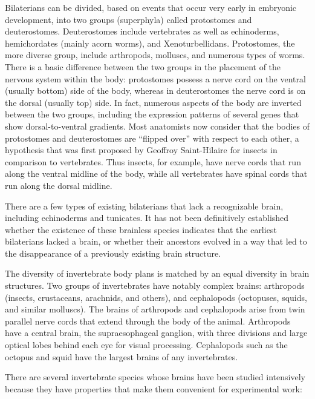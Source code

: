 \documentclass[]{book}
\begin{document}
Bilaterians can be divided, based on events that occur very early in embryonic development, into two groups (superphyla) called protostomes and deuterostomes. Deuterostomes include vertebrates as well as echinoderms, hemichordates (mainly acorn worms), and Xenoturbellidans. Protostomes, the more diverse group, include arthropods, molluscs, and numerous types of worms. There is a basic difference between the two groups in the placement of the nervous system within the body: protostomes possess a nerve cord on the ventral (usually bottom) side of the body, whereas in deuterostomes the nerve cord is on the dorsal (usually top) side. In fact, numerous aspects of the body are inverted between the two groups, including the expression patterns of several genes that show dorsal-to-ventral gradients. Most anatomists now consider that the bodies of protostomes and deuterostomes are ``flipped over'' with respect to each other, a hypothesis that was first proposed by Geoffroy Saint-Hilaire for insects in comparison to vertebrates. Thus insects, for example, have nerve cords that run along the ventral midline of the body, while all vertebrates have spinal cords that run along the dorsal midline.

There are a few types of existing bilaterians that lack a recognizable brain, including echinoderms and tunicates. It has not been definitively established whether the existence of these brainless species indicates that the earliest bilaterians lacked a brain, or whether their ancestors evolved in a way that led to the disappearance of a previously existing brain structure.

The diversity of invertebrate body plans is matched by an equal diversity in brain structures. Two groups of invertebrates have notably complex brains: arthropods (insects, crustaceans, arachnids, and others), and cephalopods (octopuses, squids, and similar molluscs). The brains of arthropods and cephalopods arise from twin parallel nerve cords that extend through the body of the animal. Arthropods have a central brain, the supraesophageal ganglion, with three divisions and large optical lobes behind each eye for visual processing. Cephalopods such as the octopus and squid have the largest brains of any invertebrates.

There are several invertebrate species whose brains have been studied intensively because they have properties that make them convenient for experimental work:
\end{document}
